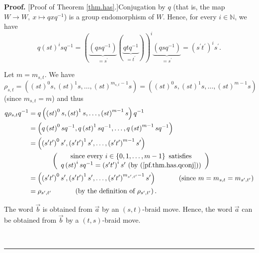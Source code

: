 \documentclass
[numbers=enddot,12pt,final,onecolumn,notitlepage,abstracton]{scrartcl}%
\theoremstyle{definition}
\newenvironment{proof}[1][Proof]{\noindent\textbf{#1.} }{\ \rule{0.5em}{0.5em}}
\begin{document}
\begin{proof}
[Proof of Theorem \ref{thm.has}.]Conjugation by $q$ (that is, the map
$W\rightarrow W,\ x\mapsto qxq^{-1}$) is a group endomorphism of $W$. Hence,
for every $i\in\mathbb{N}$, we have%
\begin{equation}
q\left(  st\right)  ^{i}sq^{-1}=\left(  \underbrace{\left(  qsq^{-1}\right)
}_{=s^{\prime}}\left(  \underbrace{qtq^{-1}}_{=t^{\prime}}\right)  \right)
^{i}\underbrace{\left(  qsq^{-1}\right)  }_{=s^{\prime}}=\left(  s^{\prime
}t^{\prime}\right)  ^{i}s^{\prime}. \label{pf.thm.has.qconj}%
\end{equation}


Let $m=m_{s,t}$. We have%
\[
\rho_{s,t}=\left(  \left(  st\right)  ^{0}s,\left(  st\right)  ^{1}%
s,\ldots,\left(  st\right)  ^{m_{s,t}-1}s\right)  =\left(  \left(  st\right)
^{0}s,\left(  st\right)  ^{1}s,\ldots,\left(  st\right)  ^{m-1}s\right)
\]
(since $m_{s,t}=m$) and thus%
\begin{align*}
q\rho_{s,t}q^{-1}  &  =q\left(  \left(  st\right)  ^{0}s,\left(  st\right)
^{1}s,\ldots,\left(  st\right)  ^{m-1}s\right)  q^{-1}\\
&  =\left(  q\left(  st\right)  ^{0}sq^{-1},q\left(  st\right)  ^{1}%
sq^{-1},\ldots,q\left(  st\right)  ^{m-1}sq^{-1}\right) \\
&  =\left(  \left(  s^{\prime}t^{\prime}\right)  ^{0}s^{\prime},\left(
s^{\prime}t^{\prime}\right)  ^{1}s^{\prime},\ldots,\left(  s^{\prime}%
t^{\prime}\right)  ^{m-1}s^{\prime}\right) \\
&  \ \ \ \ \ \ \ \ \ \ \left(
\begin{array}
[c]{c}%
\text{since every }i\in\left\{  0,1,\ldots,m-1\right\}  \text{ satisfies}\\
q\left(  st\right)  ^{i}sq^{-1}=\left(  s^{\prime}t^{\prime}\right)
^{i}s^{\prime}\text{ (by (\ref{pf.thm.has.qconj}))}%
\end{array}
\right) \\
&  =\left(  \left(  s^{\prime}t^{\prime}\right)  ^{0}s^{\prime},\left(
s^{\prime}t^{\prime}\right)  ^{1}s^{\prime},\ldots,\left(  s^{\prime}%
t^{\prime}\right)  ^{m_{s^{\prime},t^{\prime}}-1}s^{\prime}\right)
\ \ \ \ \ \ \ \ \ \ \left(  \text{since }m=m_{s,t}=m_{s^{\prime},t^{\prime}%
}\right) \\
&  =\rho_{s^{\prime},t^{\prime}}\ \ \ \ \ \ \ \ \ \ \left(  \text{by the
definition of }\rho_{s^{\prime},t^{\prime}}\right)  .
\end{align*}


The word $\overrightarrow{b}$ is obtained from $\overrightarrow{a}$ by an
$\left(  s,t\right)  $-braid move. Hence, the word $\overrightarrow{a}$ can be
obtained from $\overrightarrow{b}$ by a $\left(  t,s\right)  $-braid move.


\end{proof}
\end{document}
